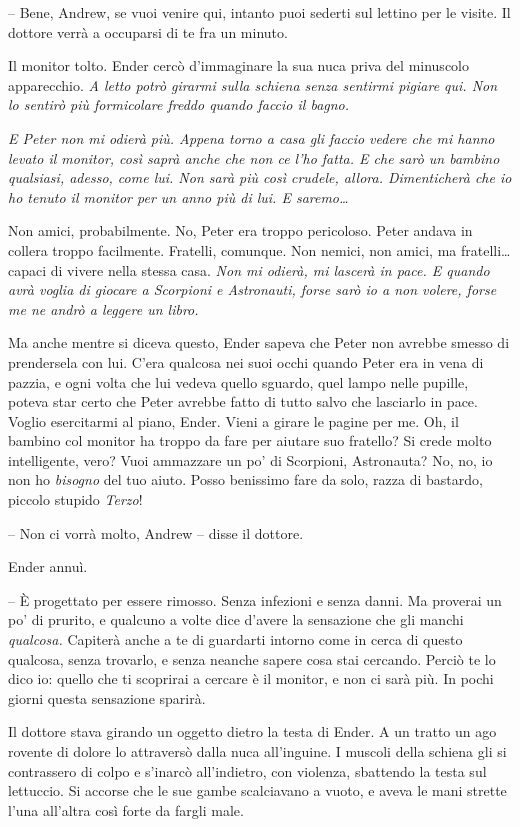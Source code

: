 {-- Bene, Andrew, se vuoi venire qui, intanto puoi sederti sul lettino
	per le visite. Il dottore verrà a occuparsi di te fra un minuto.}

{Il monitor tolto. Ender cercò d'immaginare la sua nuca priva del
	minuscolo apparecchio. \emph{A letto potrò girarmi sulla schiena senza
		sentirmi pigiare qui. Non lo sentirò più formicolare freddo quando
		faccio il bagno.}}

\emph{{E Peter non mi odierà più. Appena torno a casa gli faccio vedere
		che mi hanno levato il monitor, così saprà anche che non ce l'ho fatta.
		E che sarò un bambino qualsiasi, adesso, come lui. Non sarà più così
		crudele, allora. Dimenticherà che io ho tenuto il monitor per un anno
		più di lui. E saremo\ldots{}}}

{Non amici, probabilmente. No, Peter era troppo pericoloso. Peter andava
	in collera troppo facilmente. Fratelli, comunque. Non nemici, non amici,
	ma fratelli\ldots{} capaci di vivere nella stessa casa. \emph{Non mi
		odierà, mi lascerà in pace. E quando avrà voglia di giocare a Scorpioni
		e Astronauti, forse sarò io a non volere, forse me ne andrò a leggere un
		libro.}}

{Ma anche mentre si diceva questo, Ender sapeva che Peter non avrebbe
	smesso di prendersela con lui. C'era qualcosa nei suoi occhi quando
	Peter era in vena di pazzia, e ogni volta che lui vedeva quello sguardo,
	quel lampo nelle pupille, poteva star certo che Peter avrebbe fatto di
	tutto salvo che lasciarlo in pace. Voglio esercitarmi al piano, Ender.
	Vieni a girare le pagine per me. Oh, il bambino col monitor ha troppo da
	fare per aiutare suo fratello? Si crede molto intelligente, vero? Vuoi
	ammazzare un po' di Scorpioni, Astronauta? No, no, io non ho
	\emph{bisogno} del tuo aiuto. Posso benissimo fare da solo, razza di
	bastardo, piccolo stupido \emph{Terzo}!}

{-- Non ci vorrà molto, Andrew -- disse il dottore.}

{Ender annuì.}

{-- È progettato per essere rimosso. Senza infezioni e senza danni. Ma
	proverai un po' di prurito, e qualcuno a volte dice d'avere la
	sensazione che gli manchi \emph{qualcosa.} Capiterà anche a te di
	guardarti intorno come in cerca di questo qualcosa, senza trovarlo, e
	senza neanche sapere cosa stai cercando. Perciò te lo dico io: quello
	che ti scoprirai a cercare è il monitor, e non ci sarà più. In pochi
	giorni questa sensazione sparirà.}

{Il dottore stava girando un oggetto dietro la testa di Ender. A un
	tratto un ago rovente di dolore lo attraversò dalla nuca all'inguine. I
	muscoli della schiena gli si contrassero di colpo e s'inarcò
	all'indietro, con violenza, sbattendo la testa sul lettuccio. Si accorse
	che le sue gambe scalciavano a vuoto, e aveva le mani strette l'una
	all'altra così forte da fargli male.}


